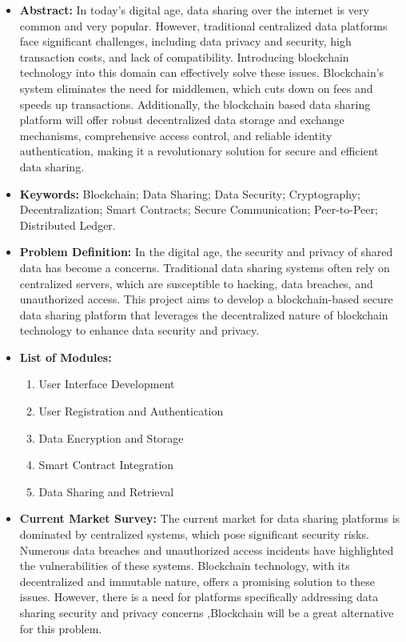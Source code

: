 \documentclass[12pt]{report}	%
\begin{document}
{{\begin{itemize}
\item{\textbf{Abstract:}}
\newline
In today's digital age, data sharing over the internet is very common and very popular. However, traditional centralized data platforms face significant challenges, including data privacy and security, high transaction costs, and lack of compatibility. Introducing blockchain technology into this domain can effectively solve these issues. Blockchain's system eliminates the need for middlemen, which cuts down on fees and speeds up transactions. Additionally, the blockchain based data sharing platform will offer robust decentralized data storage and exchange mechanisms, comprehensive access control, and reliable identity authentication, making it a revolutionary solution for secure and efficient data sharing.


\item{\textbf{Keywords:}}
\newline
Blockchain; Data Sharing; Data Security; Cryptography; Decentralization; Smart Contracts; Secure Communication; Peer-to-Peer; Distributed Ledger.

\item{\textbf{Problem Definition:}}
\newline
In the digital age, the security and privacy of shared data has become a concerns. Traditional data sharing systems often rely on centralized servers, which are susceptible to hacking, data breaches, and unauthorized access. This project aims to develop a blockchain-based secure data sharing platform that leverages the decentralized nature of blockchain technology to enhance data security and privacy.

\item{\textbf{List of Modules:}}
\begin{enumerate}
\item{User Interface Development}
\item{User Registration and Authentication}
\item{Data Encryption and Storage}
\item{Smart Contract Integration}
\item{Data Sharing and Retrieval}
\end{enumerate}

\item{\textbf{Current Market Survey:}}
\newline
The current market for data sharing platforms is dominated by centralized systems, which pose significant security risks. Numerous data breaches and unauthorized access incidents have highlighted the vulnerabilities of these systems. Blockchain technology, with its decentralized and immutable nature, offers a promising solution to these issues. However, there is a need for platforms specifically addressing data sharing security and privacy concerns ,Blockchain will be a great alternative for this problem.


\end{itemize}}}
\end{document}
